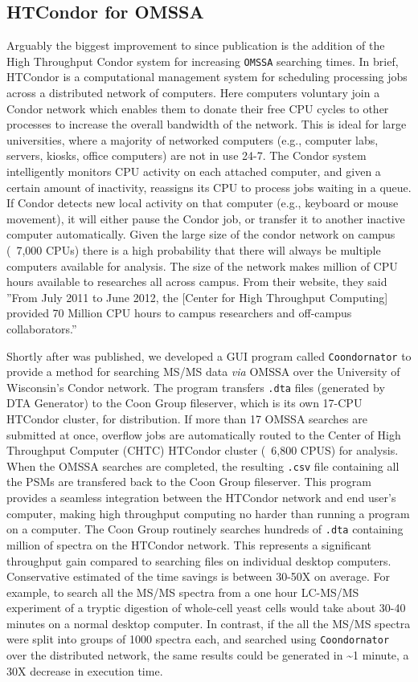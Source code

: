 \subsection*{HTCondor for OMSSA}
Arguably the biggest improvement to \compass{} since publication is the addition of the High Throughput Condor system for increasing \texttt{OMSSA} searching times. In brief, HTCondor is a computational management system for scheduling processing jobs across a distributed network of computers. Here computers voluntary join a Condor network which enables them to donate their free CPU cycles to other processes to increase the overall bandwidth of the network. This is ideal for large universities, where a majority of networked computers (e.g., computer labs, servers, kiosks, office computers) are not in use 24-7. The Condor system intelligently monitors CPU activity on each attached computer, and given a certain amount of inactivity, reassigns its CPU to process jobs waiting in a queue. If Condor detects new local activity on that computer (e.g., keyboard or mouse movement), it will either pause the Condor job, or transfer it to another inactive computer automatically. Given the large size of the condor network on campus (~7,000 CPUs) there is a high probability that there will always be multiple computers available for analysis. The size of the network makes million of CPU hours available to researches all across campus. From their website, they said ''From July 2011 to June 2012, the [Center for High Throughput Computing] provided 70 Million CPU hours to campus researchers and off-campus collaborators.''

Shortly after \compass{} was published, we developed a GUI program called \texttt{Coondornator} to provide a method for searching MS/MS data \emph{via} OMSSA over the University of Wisconsin's Condor network. The program transfers \texttt{.dta} files (generated by DTA Generator) to the Coon Group fileserver, which is its own 17-CPU HTCondor cluster, for distribution. If more than 17 OMSSA searches are submitted at once, overflow jobs are automatically routed to the Center of High Throughput Computer (CHTC) HTCondor cluster (~6,800 CPUS) for analysis. When the OMSSA searches are completed, the resulting \texttt{.csv} file containing all the PSMs are transfered back to the Coon Group fileserver. This program provides a seamless integration between the HTCondor network and end user's computer, making high throughput computing no harder than running a program on a computer. The Coon Group routinely searches hundreds of \texttt{.dta} containing million of spectra on the HTCondor network. This represents a significant throughput gain compared to searching files on individual desktop computers. Conservative estimated of the time savings is between 30-50X on average. For example, to search all the MS/MS spectra from a one hour LC-MS/MS experiment of a tryptic digestion of whole-cell yeast cells would take about 30-40 minutes on a normal desktop computer. In contrast, if the all the MS/MS spectra were split into groups of 1000 spectra each, and searched using \texttt{Coondornator} over the distributed network, the same results could be generated in \textasciitilde1 minute, a 30X decrease in execution time.

